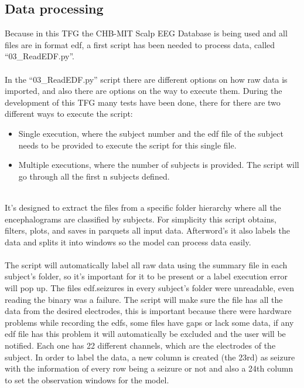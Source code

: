 \subsection{Data processing}
Because in this TFG the CHB-MIT Scalp EEG Database is being used and all files are in format edf, a first script has been needed to process data, called “03\_ReadEDF.py”.
\\\\
In the “03\_ReadEDF.py” script there are different options on how raw data is imported, and also there are options on the way to execute them. During the development of this TFG many tests have been done, there for there are two different ways to execute the script:
\\
\begin{itemize}
  \item Single execution, where the subject number and the edf file of the subject needs to be provided to execute the script for this single file. 
  \item Multiple executions, where the number of subjects is provided. The script will go through all the first n subjects defined.
\end{itemize}
\leavevmode\\
It’s designed to extract the files from a specific folder hierarchy where all the encephalograms are classified by subjects. For simplicity this script obtains, filters, plots, and saves in parquets all input data. Afterword’s it also labels the data and splits it into windows so the model can process data easily. 
\\\\
The script will automatically label all raw data using the summary file in each subject’s folder, so it’s important for it to be present or a label execution error will pop up. The files edf.seizures in every subject’s folder were unreadable, even reading the binary was a failure. The script will make sure the file has all the data from the desired electrodes, this is important because there were hardware problems while recording the edfs, some files have gaps or lack some data, if any edf file has this problem it will automatically be excluded and the user will be notified. Each one has 22 different channels, which are the electrodes of the subject. In order to label the data, a new column is created (the 23rd) as seizure with the information of every row being a seizure or not and also a 24th column to set the observation windows for the model.
\\\\
